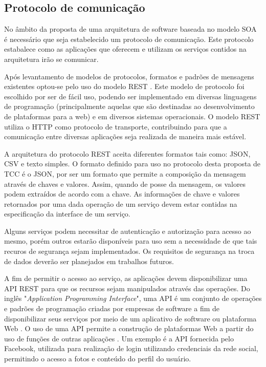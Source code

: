 \subsection{Protocolo de comunicação}

No âmbito da proposta de uma arquitetura de software baseada no modelo SOA é necessário que seja estabelecido um protocolo de comunicação. Este protocolo estabalece como as aplicações que oferecem e utilizam os serviços contidos na arquitetura irão se comunicar.

Após levantamento de modelos de protocolos, formatos e padrões de mensagens existentes optou-se pelo uso do modelo REST \cite{rozlog_restesoap_2013}. Este modelo de protocolo foi escolhido por ser de fácil uso, podendo ser implementado em diversas linguagens de programação (principalmente aquelas que são destinadas ao desenvolvimento de plataformas para a web) e em diversos sistemas operacionais. O modelo REST utiliza o HTTP como protocolo de transporte, contribuindo para que a comunicação entre diversas aplicações seja realizada de maneira mais estável.

A arquitetura do protocolo REST aceita diferentes formatos tais como: JSON, CSV e texto simples. O formato definido para uso no protocolo desta proposta de TCC é o JSON, por ser um formato que permite a composição da mensagem através de chaves e valores. Assim, quando de posse da mensagem, os valores podem extraídos de acordo com a chave. As informações de chave e valores retornados por uma dada operação de um serviço devem estar contidas na especificação da interface de um serviço.


Alguns serviços podem necessitar de autenticação e autorização para acesso ao mesmo, porém outros estarão disponíveis para uso sem a necessidade de que tais recuros de segurança sejam implementados. Os requisitos de segurança na troca de dados deverão ser planejados em trabalhos futuros.

A fim de permitir o acesso ao serviço, as aplicações devem disponibilizar uma API REST para que os recursos sejam manipulados através das operações. Do inglês "\textit{Application Programming Interface}", uma API é um conjunto de operações e padrões de programação criadas por empresas de software a fim de disponibilizar seus serviços por meio de um aplicativo de software ou plataforma Web \cite{canaltech_o_2015}. O uso de uma API permite a construção de plataformas Web a partir do uso de funções de outras aplicações \cite{canaltech_o_2015}. Um exemplo é a API fornecida pelo Facebook, utilizada para realização de login utilizando credenciais da rede social, permitindo o acesso a fotos e conteúdo do perfil do usuário.


